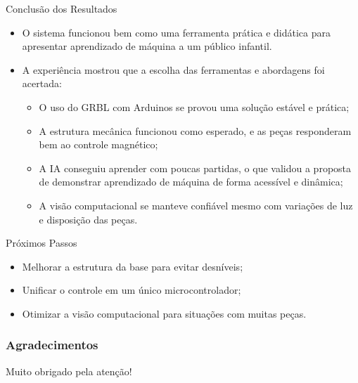 \documentclass{beamer}
\begin{document}
\begin{frame}{Conclusão dos Resultados}
  \begin{itemize}
    \item O sistema funcionou bem como uma ferramenta prática e didática para apresentar aprendizado de máquina a um público infantil.

\item A experiência mostrou que a escolha das ferramentas e abordagens foi acertada:
\begin{itemize}
  \item O uso do GRBL com Arduinos se provou uma solução estável e prática;
  \item A estrutura mecânica funcionou como esperado, e as peças responderam bem ao controle magnético;
  \item A IA conseguiu aprender com poucas partidas, o que validou a proposta de demonstrar aprendizado de máquina de forma acessível e dinâmica;
  \item A visão computacional se manteve confiável mesmo com variações de luz e disposição das peças.
\end{itemize}

  \end{itemize}
\end{frame}


\begin{frame}{Próximos Passos}
  \begin{itemize}
    \item Melhorar a estrutura da base para evitar desníveis;
    \item Unificar o controle em um único microcontrolador;
    \item Otimizar a visão computacional para situações com muitas peças.
  \end{itemize}
\end{frame}


\begin{frame}[plain]
  \frametitle{Agradecimentos}

  \vspace{1.5cm}
  \centering
  \Huge Muito obrigado pela atenção!

\end{frame}
\end{document}
